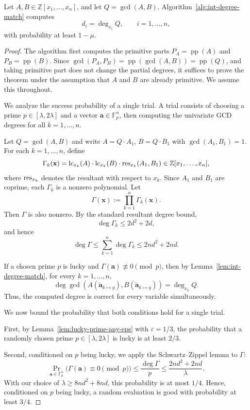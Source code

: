 \documentclass{article}
\numberwithin{equation}{section}
\begin{document}
\begin{theorem}\label{thm:int-degree-match}
Let $A, B \in \mathbb{Z}[x_1,\dots,x_n]$, and let $Q = \gcd(A,B)$. 
Algorithm~\ref{alg:int-degree-match} computes
\[
d_i = \deg_{x_i} Q, \qquad i=1,\dots,n,
\]
with probability at least $1-\mu$.
\end{theorem}

\begin{proof}
The algorithm first computes the primitive parts $P_A = \operatorname{pp}(A)$ and $P_B = \operatorname{pp}(B)$.
Since $\gcd(P_A, P_B) = \operatorname{pp}(\gcd(A,B)) = \operatorname{pp}(Q)$, and taking primitive part does not change the partial degrees, it suffices to prove the theorem under the assumption that $A$ and $B$ are already primitive. We assume this throughout.

We analyze the success probability of a single trial. A trial consists of choosing a prime $p \in [\lambda, 2\lambda]$ and a vector $\mathbf{a} \in \mathbb{F}_p^n$, then computing the univariate GCD degrees for all $k=1,\dots,n$.

Let $Q = \gcd(A,B)$ and write $A = Q \cdot A_1$, $B = Q \cdot B_1$ with $\gcd(A_1, B_1) = 1$. For each $k=1,\dots,n$, define
\[
\Gamma_k(\mathbf{x}) = \operatorname{lc}_{x_k}(A) \cdot \operatorname{lc}_{x_k}(B) \cdot \hbox{\rm{res}}_{x_k}(A_1, B_1) \in \mathbb{Z}[x_1,\dots,x_n],
\]
where $\hbox{\rm{res}}_{x_k}$ denotes the resultant with respect to $x_k$. Since $A_1$ and $B_1$ are coprime, each $\Gamma_k$ is a nonzero polynomial. Let
\[
\Gamma(\mathbf{x}) := \prod_{k=1}^n \Gamma_k(\mathbf{x}).
\]
Then $\Gamma$ is also nonzero.
%
By the standard resultant degree bound,
\[
\deg \Gamma_k \le 2d^2 + 2d,
\]
and hence
\[
\deg \Gamma \le \sum_{k=1}^n \deg \Gamma_k \le 2nd^2 + 2nd.
\]

If a chosen prime $p$ is lucky and $\Gamma(\mathbf{a}) \not\equiv 0 \pmod{p}$, then by Lemma~\ref{lem:int-degree-match}, for every $k=1,\dots,n$,
\[
\deg \gcd(A(\mathbf{\check{a}}_{k \mapsto y} ), B(\mathbf{\check{a}}_{k \mapsto y} )) = \deg_{x_k} Q.
\]
Thus, the computed degree is correct for every variable simultaneously.

We now bound the probability that both conditions hold for a single trial.

First, by Lemma~\ref{lem:lucky-prime-any-eps} with $\varepsilon = 1/3$, the probability that a randomly chosen prime $p \in [\lambda, 2\lambda]$ is lucky is at least $2/3$.

Second, conditioned on $p$ being lucky, we apply the Schwartz--Zippel lemma to $\Gamma$:
\[
\Pr_{\mathbf{a} \in \mathbb{F}_p^n}\bigl(\Gamma(\mathbf{a}) \equiv 0 \pmod{p}\bigr)
\le \frac{\deg \Gamma}{p}
\le \frac{2nd^2 + 2nd}{\lambda}.
\]
With our choice of $\lambda \ge 8nd^2 + 8nd$, this probability is at most $1/4$. Hence, conditioned on $p$ being lucky, a random evaluation is good with probability at least $3/4$.


\end{proof}
\end{document}
